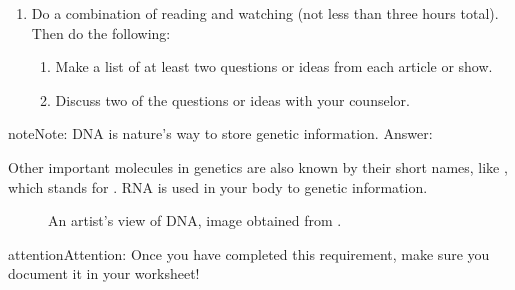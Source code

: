 \documentclass[letterpaper,10pt,english,openany,oneside]{sphinxmanual}
\let\sphinxpxdimen\pdfpxdimen\else\newdimen\sphinxpxdimen
\begin{document}
\begin{enumerate}
\item {} 
Do a combination of reading and watching (not less than three hours total). Then do the following:
\begin{enumerate}
%
\item {} 
Make a list of at least two questions or ideas from each article or show.

\item {} 
Discuss two of the questions or ideas with your counselor.

\end{enumerate}

\end{enumerate}

\begin{sphinxadmonition}{note}{Note:}
DNA is nature’s way to store genetic information. 
Answer: 

Other important molecules in genetics are also known by their short names, like , which stands for . RNA is used in your body to  genetic information.

\begin{figure}[H]
\centering
\capstart

\noindent\sphinxincludegraphics[width=400\sphinxpxdimen]{{dna}.jpg}
\caption{An artist’s view of DNA, image obtained from .}\label{\detokenize{requirement1:id1}}\end{figure}
\end{sphinxadmonition}

\begin{sphinxadmonition}{attention}{Attention:}
Once you have completed this requirement, make sure you document it in your worksheet!
\end{sphinxadmonition}
\end{document}
